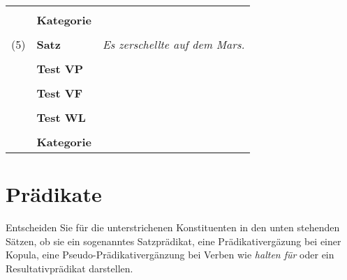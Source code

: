 \begin{center}
\begin{longtable}[h]{clp{}}
    &&\\
    & \textbf{Kategorie} & \\\cline{3-3}
    &&\\
    (5) & \textbf{Satz} & \textit{Es zerschellte auf dem Mars.} \\
    &&\\
    & \textbf{Test VP} & \\\cline{3-3}
    &&\\
    & \textbf{Test VF} & \\\cline{3-3}
    &&\\
    & \textbf{Test WL} & \\\cline{3-3}
    &&\\
    & \textbf{Kategorie} & \\\cline{3-3}
  \end{longtable}
\end{center}


\section{Prädikate}

Entscheiden Sie für die unterstrichenen Konstituenten in den unten stehenden Sätzen, ob sie ein sogenanntes Satzprädikat, eine Prädikativergäzung bei einer Kopula, eine Pseudo-Prädikativergänzung bei Verben wie \textit{halten für} oder ein Resultativprädikat darstellen.


